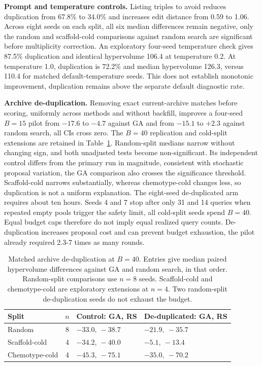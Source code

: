 \documentclass[11pt]{article}
\begin{document}
\textbf{Prompt and temperature controls.} Listing triples to avoid reduces duplication from 67.8\% to 34.0\% and increases edit distance from 0.59 to 1.06. Across eight seeds on each split, all six median differences remain negative, only the random and scaffold-cold comparisons against random search are significant before multiplicity correction. An exploratory four-seed temperature check gives 87.5\% duplication and identical hypervolume 106.4 at temperature 0.2. At temperature 1.0, duplication is 72.2\% and median hypervolume 126.3, versus 110.4 for matched default-temperature seeds. This does not establish monotonic improvement, duplication remains above the separate default diagnostic rate.

\textbf{Archive de-duplication.} Removing exact current-archive matches before scoring, uniformly across methods and without backfill, improves a four-seed $B=15$ pilot from $-17.6$ to $-4.7$ against GA and from $-15.1$ to $+2.3$ against random search, all CIs cross zero. The $B=40$ replication and cold-split extensions are retained in Table~\ref{tab:dedup}. Random-split medians narrow without changing sign, and both unadjusted tests become non-significant. Its independent control differs from the primary run in magnitude, consistent with stochastic proposal variation, the GA comparison also crosses the significance threshold. Scaffold-cold narrows substantially, whereas chemotype-cold changes less, so duplication is not a uniform explanation. The eight-seed de-duplicated arm requires about ten hours. Seeds 4 and 7 stop after only 31 and 14 queries when repeated empty pools trigger the safety limit, all cold-split seeds spend $B=40$. Equal budget caps therefore do not imply equal realized query counts. De-duplication increases proposal cost and can prevent budget exhaustion, the pilot already required 2.3-7 times as many rounds.

\begin{table}[!htbp]
\caption{Matched archive de-duplication at $B=40$. Entries give median paired hypervolume differences against GA and random search, in that order. Random-split comparisons use $n=8$ seeds. Scaffold-cold and chemotype-cold are exploratory extensions at $n=4$. Two random-split de-duplication seeds do not exhaust the budget.}
\label{tab:dedup}
\centering
\begin{tabular}{@{}lcll@{}}
\toprule
Split & $n$ & Control: GA, RS & De-duplicated: GA, RS \\
\midrule
Random & 8 & $-33.0,\ -38.7$ & $-21.9,\ -35.7$ \\
Scaffold-cold & 4 & $-34.2,\ -40.0$ & $-5.1,\ -13.4$ \\
Chemotype-cold & 4 & $-45.3,\ -75.1$ & $-35.0,\ -70.2$ \\
\bottomrule
\end{tabular}

\end{table}
\end{document}
